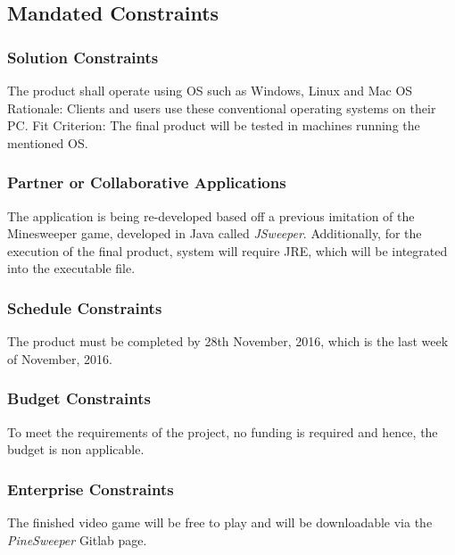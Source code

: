 \documentclass[12pt, titlepage]{article}
\begin{document}
\newpage
\subsection{Mandated Constraints}
\subsubsection{Solution Constraints}
The product shall operate using OS such as Windows, Linux and  Mac OS
Rationale: Clients and users use these conventional operating systems on their PC.
Fit Criterion: The final product will be tested in machines running the mentioned OS.

\subsubsection{Partner or Collaborative Applications}
The application is being re-developed based off a previous imitation of the Minesweeper game, developed in Java called
\textit{JSweeper}. Additionally, for the execution of the final product, system will require JRE, which will be integrated into 
the executable file.

\subsubsection{Schedule Constraints}
The product must be completed by 28th November, 2016, which is the last week of November, 2016.

\subsubsection{Budget Constraints}
To meet the requirements of the project, no funding is required and hence, the budget is non applicable.

\subsubsection{Enterprise Constraints}
The finished video game will be free to play and will be downloadable via the \textit{PineSweeper} Gitlab page.

\newpage
\end{document}
